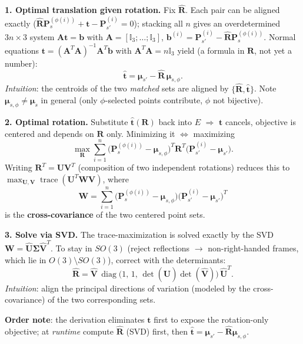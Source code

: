 \documentclass{article}
\begin{document}
\textbf{1. Optimal translation given rotation.} Fix $\hat{\mathbf{R}}$. Each pair can be aligned exactly ($\hat{\mathbf{R}}\mathbf{P}_s^{(\phi(i))} + \mathbf{t} - \mathbf{P}_{s'}^{(i)} = 0$); stacking all $n$ gives an overdetermined $3n\times 3$ system $\mathbf{A}\mathbf{t}=\mathbf{b}$ with $\mathbf{A}=[\mathbb{I}_3;\dots;\mathbb{I}_3]$, $\mathbf{b}^{(i)}=\mathbf{P}_{s'}^{(i)}-\hat{\mathbf{R}}\mathbf{P}_s^{(\phi(i))}$. Normal equations $\mathbf{t}=(\mathbf{A}^T\mathbf{A})^{-1}\mathbf{A}^T\mathbf{b}$ with $\mathbf{A}^T\mathbf{A}=n\mathbb{I}_3$ yield (a formula in $\mathbf{R}$, not yet a number):
$$
\hat{\mathbf{t}} = \boldsymbol{\mu}_{s'} - \hat{\mathbf{R}}\,\boldsymbol{\mu}_{s,\phi}.
$$
\textit{Intuition}: the centroids of the two \textit{matched} sets are aligned by $\{\hat{\mathbf{R}},\hat{\mathbf{t}}\}$. Note $\boldsymbol{\mu}_{s,\phi}\neq\boldsymbol{\mu}_s$ in general (only $\phi$-selected points contribute, $\phi$ not bijective).

\textbf{2. Optimal rotation.} Substitute $\hat{\mathbf{t}}(\mathbf{R})$ back into $E$ $\Rightarrow$ $\mathbf{t}$ cancels, objective is centered and depends on $\mathbf{R}$ only. Minimizing it $\Leftrightarrow$ maximizing
$$
\max_{\mathbf{R}}\sum_{i=1}^{n}\big(\mathbf{P}_s^{(\phi(i))}-\boldsymbol{\mu}_{s,\phi}\big)^T\mathbf{R}^T\big(\mathbf{P}_{s'}^{(i)}-\boldsymbol{\mu}_{s'}\big).
$$
Writing $\mathbf{R}^T=\mathbf{U}\mathbf{V}^T$ (composition of two independent rotations) reduces this to $\max_{\mathbf{U},\mathbf{V}}\operatorname{trace}(\mathbf{U}^T\mathbf{W}\mathbf{V})$, where
$$
\mathbf{W}=\sum_{i=1}^{n}\big(\mathbf{P}_s^{(\phi(i))}-\boldsymbol{\mu}_{s,\phi}\big)\big(\mathbf{P}_{s'}^{(i)}-\boldsymbol{\mu}_{s'}\big)^T
$$
is the \textbf{cross-covariance} of the two centered point sets.

\textbf{3. Solve via SVD.} The trace-maximization is solved exactly by the SVD $\mathbf{W}=\hat{\mathbf{U}}\boldsymbol{\Sigma}\hat{\mathbf{V}}^T$. To stay in $SO(3)$ (reject reflections $\to$ non-right-handed frames, which lie in $O(3)\setminus SO(3)$), correct with the determinants:
$$
\hat{\mathbf{R}} = \hat{\mathbf{V}}\,\operatorname{diag}\!\big(1,\,1,\,\det(\hat{\mathbf{U}})\det(\hat{\mathbf{V}})\big)\,\hat{\mathbf{U}}^T.
$$
\textit{Intuition}: align the principal directions of variation (modeled by the cross-covariance) of the two corresponding sets.

\textbf{Order note}: the derivation eliminates $\mathbf{t}$ first to expose the rotation-only objective; at \textit{runtime} compute $\hat{\mathbf{R}}$ (SVD) first, then $\hat{\mathbf{t}}=\boldsymbol{\mu}_{s'}-\hat{\mathbf{R}}\boldsymbol{\mu}_{s,\phi}$.
\end{document}
